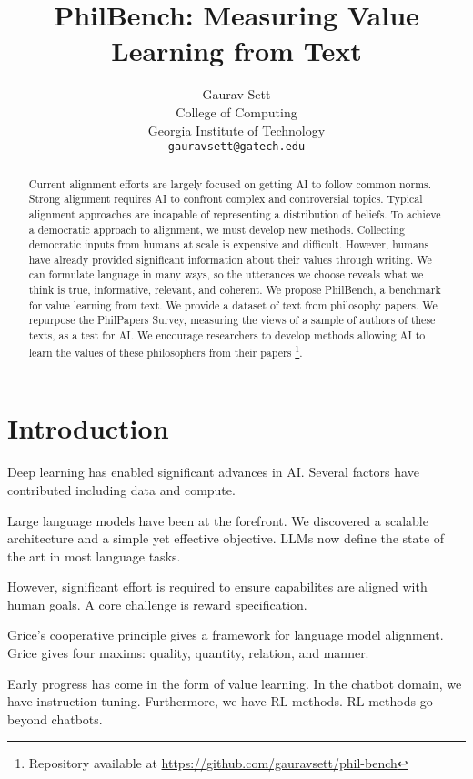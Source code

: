\documentclass{article}
\title{PhilBench: Measuring Value Learning from Text}
\author{%
    Gaurav Sett \\ 
    College of Computing\\
    Georgia Institute of Technology\\
    \texttt{gauravsett@gatech.edu} \\
    }
\newcommand{\pcite}[1]{\parencite{#1}}
\begin{document}
\maketitle


\begin{abstract}
    Current alignment efforts are largely focused on getting AI to follow common norms. 
    Strong alignment requires AI to confront complex and controversial topics. 
    Typical alignment approaches are incapable of representing a distribution of beliefs. 
    To achieve a democratic approach to alignment, we must develop new methods. 
    Collecting democratic inputs from humans at scale is expensive and difficult. 
    However, humans have already provided significant information about their values through writing. 
    We can formulate language in many ways, so the utterances we choose reveals what we think is true, informative, relevant, and coherent. 
    We propose PhilBench, a benchmark for value learning from text. We provide a dataset of text from philosophy papers. 
    We repurpose the PhilPapers Survey, measuring the views of a sample of authors of these texts, as a test for AI. 
    We encourage researchers to develop methods allowing AI to learn the values of these philosophers from their papers \footnote{Repository available at \url{https://github.com/gauravsett/phil-bench}}.
\end{abstract}


\section{Introduction}

Deep learning has enabled significant advances in AI.
Several factors have contributed including data and compute.

Large language models have been at the forefront.
We discovered a scalable architecture and a simple yet effective objective.
LLMs now define the state of the art in most language tasks.

However, significant effort is required to ensure capabilites are aligned with human goals.
A core challenge is reward specification.

Grice's cooperative principle \pcite{grice1975logic} gives a framework for language model alignment.
Grice gives four maxims: quality, quantity, relation, and manner.

Early progress has come in the form of value learning.
In the chatbot domain, we have instruction tuning.
Furthermore, we have RL methods. RL methods go beyond chatbots.
\end{document}
